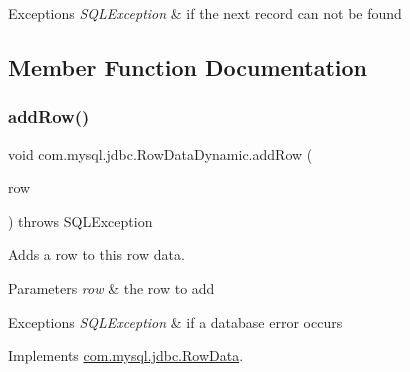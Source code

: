 \begin{DoxyExceptions}{Exceptions}
{\em S\+Q\+L\+Exception} & if the next record can not be found \\
\hline
\end{DoxyExceptions}


\subsection{Member Function Documentation}
\mbox{\label{classcom_1_1mysql_1_1jdbc_1_1_row_data_dynamic_a2ce60372d6361c19417d93cbea24a0c9}} 
\subsubsection{\texorpdfstring{add\+Row()}{addRow()}}
{\footnotesize\ttfamily void com.\+mysql.\+jdbc.\+Row\+Data\+Dynamic.\+add\+Row (\begin{DoxyParamCaption}\item[{\mbox{\hyperlink{classcom_1_1mysql_1_1jdbc_1_1_result_set_row}{Result\+Set\+Row}}}]{row }\end{DoxyParamCaption}) throws S\+Q\+L\+Exception}

Adds a row to this row data.


\begin{DoxyParams}{Parameters}
{\em row} & the row to add \\
\hline
\end{DoxyParams}

\begin{DoxyExceptions}{Exceptions}
{\em S\+Q\+L\+Exception} & if a database error occurs \\
\hline
\end{DoxyExceptions}


Implements \mbox{\hyperlink{interfacecom_1_1mysql_1_1jdbc_1_1_row_data_ac44d5df9c92d845272df5a13f15b9de7}{com.\+mysql.\+jdbc.\+Row\+Data}}.

\mbox{\label{classcom_1_1mysql_1_1jdbc_1_1_row_data_dynamic_a6e2ff86fe3a346ae4f5a835470fd6986}} 
